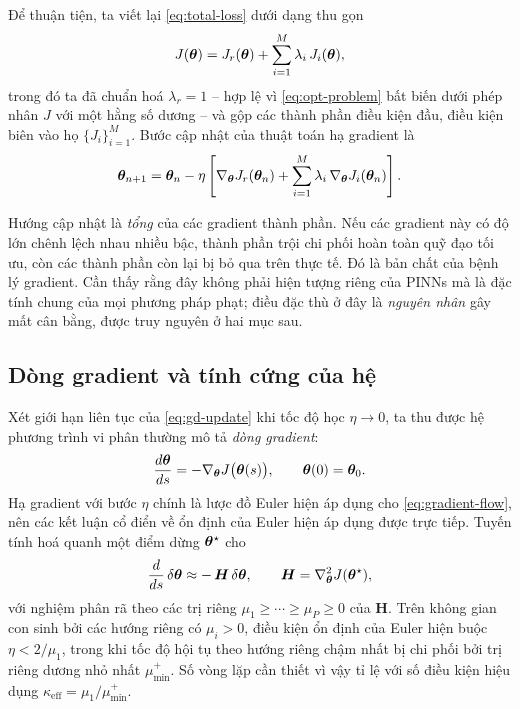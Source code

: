 Để thuận tiện, ta viết lại \eqref{eq:total-loss} dưới dạng thu gọn
\begin{equation}
J(\bm{\theta})
= J_{r}(\bm{\theta})
+ \sum_{i=1}^{M} \lambda_{i}\, J_{i}(\bm{\theta}),
\label{eq:loss-compact}
\end{equation}
trong đó ta đã chuẩn hoá $\lambda_{r} = 1$ -- hợp lệ vì \eqref{eq:opt-problem}
bất biến dưới phép nhân $J$ với một hằng số dương -- và gộp các thành phần điều
kiện đầu, điều kiện biên vào họ $\{J_{i}\}_{i=1}^{M}$. Bước cập nhật của thuật
toán hạ gradient là
\begin{equation}
\bm{\theta}_{n+1}
= \bm{\theta}_{n}
- \eta \left[
    \nabla_{\bm{\theta}} J_{r}(\bm{\theta}_{n})
    + \sum_{i=1}^{M} \lambda_{i}\, \nabla_{\bm{\theta}} J_{i}(\bm{\theta}_{n})
  \right].
\label{eq:gd-update}
\end{equation}
 
Hướng cập nhật là \emph{tổng} của các gradient thành phần. Nếu các gradient này
có độ lớn chênh lệch nhau nhiều bậc, thành phần trội chi phối hoàn toàn quỹ đạo
tối ưu, còn các thành phần còn lại bị bỏ qua trên thực tế. Đó là bản chất của
bệnh lý gradient. Cần thấy rằng đây không phải hiện tượng riêng của PINNs mà là
đặc tính chung của mọi phương pháp phạt; điều đặc thù ở đây là \emph{nguyên nhân}
gây mất cân bằng, được truy nguyên ở hai mục sau.
 
\subsection{Dòng gradient và tính cứng của hệ}
\label{subsec:dong-gradient}
 
Xét giới hạn liên tục của \eqref{eq:gd-update} khi tốc độ học $\eta \to 0$, ta
thu được hệ phương trình vi phân thường mô tả \emph{dòng gradient}:
\begin{equation}
\frac{d\bm{\theta}}{ds} = -\nabla_{\bm{\theta}} J\big(\bm{\theta}(s)\big),
\qquad \bm{\theta}(0) = \bm{\theta}_{0}.
\label{eq:gradient-flow}
\end{equation}
Hạ gradient với bước $\eta$ chính là lược đồ Euler hiện áp dụng cho
\eqref{eq:gradient-flow}, nên các kết luận cổ điển về ổn định của Euler hiện áp
dụng được trực tiếp. Tuyến tính hoá quanh một điểm dừng $\bm{\theta}^{\star}$ cho
\begin{equation}
\frac{d}{ds}\,\delta\bm{\theta}
\approx -\, \bm{H}\, \delta\bm{\theta},
\qquad
\bm{H} = \nabla^{2}_{\bm{\theta}} J(\bm{\theta}^{\star}),
\label{eq:linearized-flow}
\end{equation}
với nghiệm phân rã theo các trị riêng $\mu_{1} \ge \cdots \ge \mu_{P} \ge 0$ của
$\bm{H}$. Trên không gian con sinh bởi các hướng riêng có $\mu_i > 0$, điều kiện
ổn định của Euler hiện buộc $\eta < 2/\mu_{1}$, trong khi tốc độ hội tụ theo
hướng riêng chậm nhất bị chi phối bởi trị riêng dương nhỏ nhất $\mu_{\min}^{+}$.
Số vòng lặp cần thiết vì vậy tỉ lệ với số điều kiện hiệu dụng
$\kappa_{\mathrm{eff}} = \mu_{1}/\mu_{\min}^{+}$.
 
